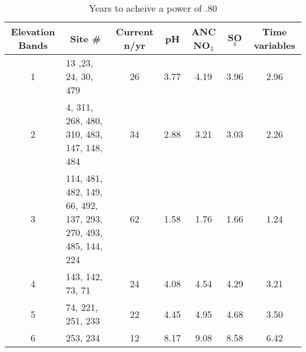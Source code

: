 \begin{table}[htbp]
\caption{Years to acheive a power of .80}
\begin{tabular}{clccccc}
\toprule
\multicolumn{1}{p{2cm}}{Elevation Bands} & \multicolumn{1}{c}{Site \#} & \multicolumn{1}{p{2cm}}{Current n/yr} & pH &\multicolumn{1}{p{1cm}}{ ANC NO$_3$} & SO$_4$ & \multicolumn{1}{p{3cm}}{Time variables} \\  
\midrule
1 & 13 ,23, 24, 30, 479 & 26 & 3.77  & 4.19  & 3.96  & 2.96  \\ 
2 & \multicolumn{1}{p{4cm}}{4, 311, 268, 480, 310, 483, 147, 148, 484} & 34 & 2.88  & 3.21  & 3.03  & 2.26  \\ 
3 & \multicolumn{ 1}{p{4cm}}{114, 481, 482, 149, 66, 492, 137, 293, 270, 493, 485, 144, 224} & \multicolumn{ 1}{c}{62} & \multicolumn{ 1}{c}{1.58 } & \multicolumn{ 1}{c}{1.76 } & \multicolumn{ 1}{c}{1.66 } & \multicolumn{ 1}{c}{1.24} \\ 
4 & 143, 142, 73, 71 & 24 & 4.08  & 4.54  & 4.29  & 3.21  \\ 
5 & 74, 221, 251, 233 & 22 & 4.45  & 4.95  & 4.68  & 3.50  \\ 
6 & 253, 234 & 12 & 8.17  & 9.08  & 8.58  & 6.42  \\  
\bottomrule
\end{tabular}
\label{tab:currentyrsto.80}
\end{table}